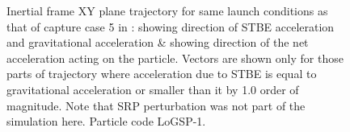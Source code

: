 \begin{figure}[htb]
\caption{Inertial frame XY plane trajectory for same launch conditions as that of capture case 5 in : \protect{} showing direction of \gls{STBE} acceleration and gravitational acceleration \& \protect{} showing direction of the net acceleration acting on the particle. Vectors are shown only for those parts of trajectory where acceleration due to \gls{STBE} is equal to gravitational acceleration or smaller than it by 1.0 order of magnitude. Note that \gls{SRP} perturbation was not part of the simulation here. Particle code LoGSP-1.}
\label{fig:LoGSP_1_capture_case_5_2d_noSRP_accelerationVectorPlot_inertialFrame}
\end{figure}
\FloatBarrier
